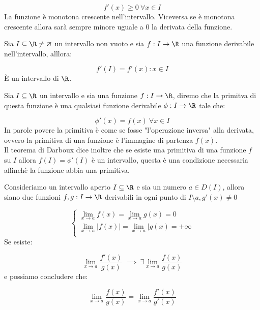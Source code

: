 \documentclass[../analisi.tex]{subfiles}
\begin{document}
\begin{equation}
	f' ( x ) \geq 0 \ \forall x \in I	
\end{equation}
La funzione è monotona crescente nell'intervallo. Viceversa se è monotona
crescente allora sarà sempre minore uguale a 0 la derivata della funzione.


\begin{defn}[Darboux]
Sia $ I \subseteq \R  \neq \varnothing $ un intervallo non vuoto e sia 
$ f: I \to \R $ una funzione derivabile nell'intervallo, alllora:

\begin{equation}
	f' ( I ) = { f' ( x ) : x\in I } 
\end{equation}
È un intervallo di $ \R $.\\
\end{defn}

\begin{defn}[Primitive]
Sia $ I \subseteq \R $ un intervallo e sia una funzione $ f: I \to \R $,
diremo che la primitva di questa funzione è una qualsiasi funzione derivabile
$ \phi : I \to \R $ tale che:

\begin{equation}
	\phi' (x) = f ( x )\ \forall x \in I
\end{equation}
In parole povere la primitiva è come se fosse "l'operazione inversa"
alla derivata, ovvero la primitiva di una funzione è l'immagine di partenza
$f ( x ) $.\\
Il teorema di Darboux dice inoltre che se esiste una primitiva di una funzione 
$ f $ su $ I $ allora $ f ( I ) = \phi ' (I) $ è un intervallo, questa 
è una condizione necessaria affinchè la funzione abbia una primitiva.
\end{defn}

\begin{defn}[Hôpital]
Consideriamo un intervallo aperto $ I \subseteq  \R $ e sia un numero
$ a \in D(I) $, allora siano due funzioni $ f,g: I \to \R $ derivabili in ogni
punto di $ I \setminus { a }, g' ( x ) \neq 0 $ 

\begin{equation}
	\begin{cases}
		\lim_{x \to a} f(x) = \lim_{x \to a} g(x) = 0 \\
		\lim_{x \to a} | f(x) | = \lim_{ x \to a} | g ( x ) = +\infty\\ 
	\end{cases}
\end{equation}
Se esiste:

\begin{equation}
	\lim_{x \to a} \frac{f' ( x ) }{g ( x )}\ \implies\
	\exists \lim_{x \to a} \frac{f(x)}{g ( x ) } 
\end{equation}
e possiamo concludere che:

\begin{equation}
	\lim_{x\to a} \frac{f(x)}{g ( x ) } = \lim_{x \to a} 
	\frac{f' ( x ) }{g' ( x ) }
\end{equation}

\end{defn}
 
\end{document}
